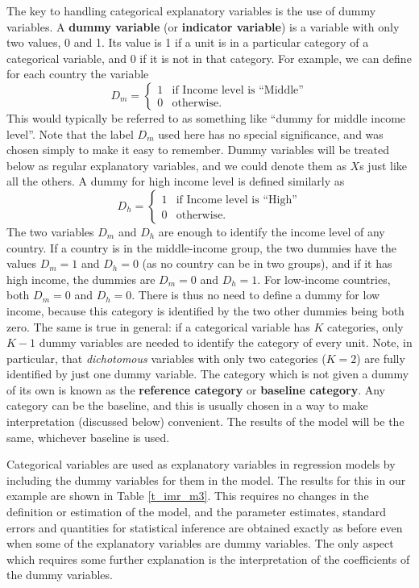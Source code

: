 The key to handling categorical explanatory variables is the use of
dummy variables. A \textbf{dummy variable} (or \textbf{indicator
variable}) is a variable with only two values, 0 and 1. Its value is 1
if a unit is in a particular category of a categorical variable, and 0
if it is not in that category. For example, we can define for each
country the variable
\[
D_{m}=\begin{cases}
1 & \text{if Income level is ``Middle''} \\
0 & \text{otherwise.}
\end{cases}
\]
This would typically be referred to as something like ``dummy for middle
income level''. Note that the label $D_{m}$ used here has no special
significance, and was chosen simply to make it easy to remember. Dummy
variables will be treated below as regular explanatory variables, and we
could denote them as $X$s just like all the others.
A dummy for high income level is defined similarly as
\[
D_{h}=\begin{cases}
1 & \text{if Income level is ``High''} \\
0 & \text{otherwise.}
\end{cases}
\]
The two variables $D_{m}$ and $D_{h}$ are enough to identify the income
level of any country. If a country is in the middle-income group, the
two dummies have the values $D_{m}=1$ and $D_{h}=0$ (as no country can
be in two groups), and if it has high income, the dummies are
$D_{m}=0$ and $D_{h}=1$. For low-income countries, both $D_{m}=0$ and
$D_{h}=0$. There is thus no need to define a dummy for low income,
because this category is identified by the two other dummies being both
zero. The same is true in general: if a categorical variable has $K$
categories, only $K-1$ dummy variables are needed to identify the
category of every unit. Note, in particular, that \emph{dichotomous}
variables with only two categories ($K=2$) are fully identified by just
one dummy variable. The category which is not given a dummy of its own
is known as the \textbf{reference category} or \textbf{baseline
category}. Any category can be the baseline, and this is usually chosen in
a way to make interpretation (discussed below) convenient. The results
of the model will be the same, whichever baseline is used.


Categorical variables are used as explanatory variables in regression
models by including the dummy variables for them in the model. The
results for this in our example are shown in Table \ref{t_imr_m3}. This
requires no changes in the definition or estimation of the model, and
the parameter estimates, standard errors and quantities for statistical
inference are obtained exactly as before even when some of the
explanatory variables are dummy variables. The only aspect which
requires some further explanation is the interpretation of the
coefficients of the dummy variables.

